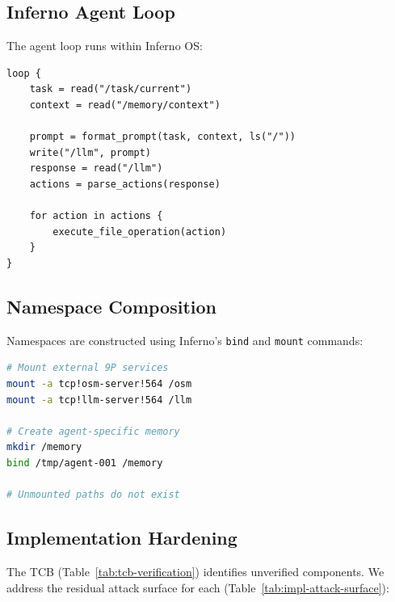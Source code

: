\documentclass{article}
\begin{document}
\subsection{Inferno Agent Loop}

The agent loop runs within Inferno OS:

\begin{lstlisting}[caption={Agent loop pseudocode}]
loop {
    task = read("/task/current")
    context = read("/memory/context")

    prompt = format_prompt(task, context, ls("/"))
    write("/llm", prompt)
    response = read("/llm")
    actions = parse_actions(response)

    for action in actions {
        execute_file_operation(action)
    }
}
\end{lstlisting}

\subsection{Namespace Composition}

Namespaces are constructed using Inferno's \texttt{bind} and \texttt{mount} commands:

\begin{lstlisting}[language=bash,caption={Namespace construction}]
# Mount external 9P services
mount -a tcp!osm-server!564 /osm
mount -a tcp!llm-server!564 /llm

# Create agent-specific memory
mkdir /memory
bind /tmp/agent-001 /memory

# Unmounted paths do not exist
\end{lstlisting}

\subsection{Implementation Hardening}
\label{sec:impl-hardening}

The TCB (Table~\ref{tab:tcb-verification}) identifies unverified components. We address the residual attack surface for each (Table~\ref{tab:impl-attack-surface}):
\end{document}
